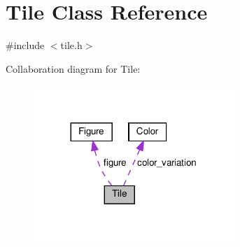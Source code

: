 \hypertarget{classTile}{}\section{Tile Class Reference}
\label{classTile}


{\ttfamily \#include $<$tile.\+h$>$}



Collaboration diagram for Tile\+:
\nopagebreak
\begin{figure}[H]
\begin{center}
\leavevmode
\includegraphics[width=215pt]{d6/dd1/classTile__coll__graph}
\end{center}
\end{figure}
